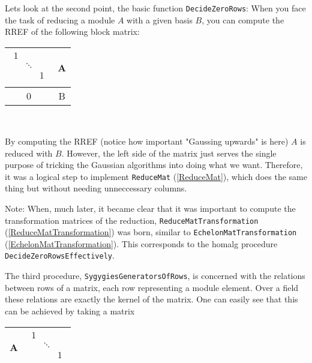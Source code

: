 \documentclass[a4paper,11pt]{report}
\begin{document}
{{ Lets look at the second point, the basic function \texttt{DecideZeroRows}: When you face the task of reducing a module $A$ with a given basis $B$, you can compute the RREF of the following block matrix: \begin{center}
\begin{tabular}{|c|c|}\hline
  $\begin{array}{ccc} 1&\\ &\ddots&\\ &&1\\ \end{array}$ &
A\\
\hline
0&
B\\
\hline
\end{tabular}\\[2mm]
\end{center}

 By computing the RREF (notice how important "Gaussing upwards" is here) $A$ is reduced with $B$. However, the left side of the matrix just serves the single purpose of
tricking the Gaussian algorithms into doing what we want. Therefore, it was a
logical step to implement \texttt{ReduceMat} (\ref{ReduceMat}), which does the same thing but without needing unneccessary columns.

 Note: When, much later, it became clear that it was important to compute the
transformation matrices of the reduction, \texttt{ReduceMatTransformation} (\ref{ReduceMatTransformation}) was born, similar to \texttt{EchelonMatTransformation} (\ref{EchelonMatTransformation}). This corresponds to the \textsf{homalg} procedure \texttt{DecideZeroRowsEffectively}.



 The third procedure, \texttt{SygygiesGeneratorsOfRows}, is concerned with the relations between rows of a matrix, each row
representing a module element. Over a field these relations are exactly the
kernel of the matrix. One can easily see that this can be achieved by taking a
matrix \begin{center}
\begin{tabular}{|c|c|}\hline
A&
  $\begin{array}{ccc} 1&\\ &\ddots&\\ &&1\\ \end{array}$ \\
\hline
\end{tabular}\\[2mm]
\end{center}

}}
\end{document}
